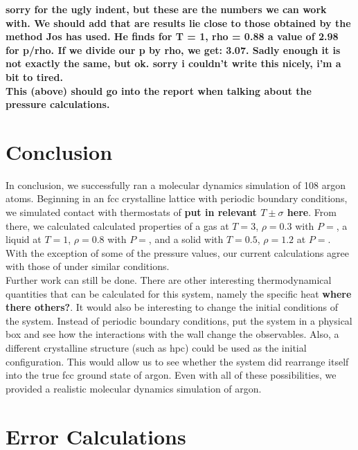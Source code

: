 \documentclass{article}
\begin{document}
\begin{multicols}{2}
\textbf{sorry for the ugly indent, but these are the numbers we can work with. We should add that are results lie close to those obtained by the method Jos has used. He finds for T = 1, rho = 0.88 a value of 2.98 for p/rho. If we divide our p by rho, we get: 3.07. Sadly enough it is not exactly the same, but ok. sorry i couldn't write this nicely, i'm a bit to tired.}\\

\textbf{This (above) should go into the report when talking about the pressure calculations.}

\section{Conclusion}
\label{conc}

In conclusion, we successfully ran a molecular dynamics simulation of 108 argon atoms.  Beginning in an fcc crystalline lattice with periodic boundary conditions, we simulated contact with thermostats of \textbf{put in relevant $T\pm \sigma$ here}.  From there, we calculated calculated properties of a gas at $T=3$, $\rho=0.3$ with $P=$, a liquid at $T=1$, $\rho =0.8$ with $P=$, and a solid with $T=0.5$, $\rho=1.2$ at $P=$.  With the exception of some of the pressure values, our current calculations agree with those of \cite{thijssen} under similar conditions.  \\

Further work can still be done.  There are other interesting thermodynamical quantities that can be calculated for this system, namely the specific heat \textbf{where there others?}.  It would also be interesting to change the initial conditions of the system.  Instead of periodic boundary conditions, put the system in a physical box and see how the interactions with the wall change the observables.  Also, a different crystalline structure (such as hpc) could be used as the initial configuration.  This would allow us to see whether the system did rearrange itself into the true fcc ground state of argon.  Even with all of these possibilities, we provided a realistic molecular dynamics simulation of argon.  

\appendix 

\section{Error Calculations}


\end{multicols}
\end{document}
